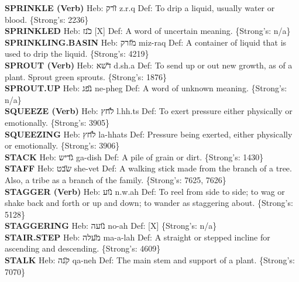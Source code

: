 {\textbf{SPRINKLE (Verb)} Heb: {\large\H זרק} z.r.q Def: To drip a liquid, usually water or blood. \{Strong's: 2236\}\hfill{}\\

\textbf{SPRINKLED} Heb: {\large\H כנז} {[}X{]} Def: A word of uncertain meaning. \{Strong's: n/a\}\hfill{}\\

\textbf{SPRINKLING.BASIN} Heb: {\large\H מזרק} miz-raq Def: A container of liquid that is used to drip the liquid. \{Strong's: 4219\}\hfill{}\\

\textbf{SPROUT (Verb)} Heb: {\large\H דשא} d.sh.a Def: To send up or out new growth, as of a plant. Sprout green sprouts. \{Strong's: 1876\}\hfill{}\\

\textbf{SPROUT.UP} Heb: {\large\H נפג} ne-pheg Def: A word of unknown meaning. \{Strong's: n/a\}\hfill{}\\

\textbf{SQUEEZE (Verb)} Heb: {\large\H לחץ} l.hh.ts Def: To exert pressure either physically or emotionally. \{Strong's: 3905\}\hfill{}\\

\textbf{SQUEEZING} Heb: {\large\H לחץ} la-hhats Def: Pressure being exerted, either physically or emotionally. \{Strong's: 3906\}\hfill{}\\

\textbf{STACK} Heb: {\large\H גדיש} ga-dish Def: A pile of grain or dirt. \{Strong's: 1430\}\hfill{}\\

\textbf{STAFF} Heb: {\large\H שבט} she-vet Def: A walking stick made from the branch of a tree. Also, a tribe as a branch of the family. \{Strong's: 7625, 7626\}\hfill{}\\

\textbf{STAGGER (Verb)} Heb: {\large\H נוע} n.w.ah Def: To reel from side to side; to wag or shake back and forth or up and down; to wander as staggering about. \{Strong's: 5128\}\hfill{}\\

\textbf{STAGGERING} Heb: {\large\H נועה} no-ah Def: {[}X{]} \{Strong's: n/a\}\hfill{}\\

\textbf{STAIR.STEP} Heb: {\large\H מעלה} ma-a-lah Def: A straight or stepped incline for ascending and descending. \{Strong's: 4609\}\hfill{}\\

\textbf{STALK} Heb: {\large\H קנה} qa-neh Def: The main stem and support of a plant. \{Strong's: 7070\}\hfill{}\\

}
